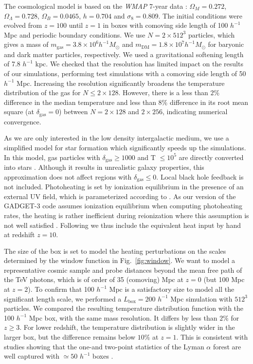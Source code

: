 \documentclass[numberedappendix]{emulateapj}
\begin{document}
The cosmological model is based on the \textit{WMAP} 7-year data \citep{2011ApJS..192...18K}: $\Omega_M=0.272$, $\Omega_{\Lambda}=0.728$, $\Omega_{B}= 0.0465$, $h=0.704$ and $\sigma_8=0.809$. The initial conditions were evolved from $z=100$ until $z=1$ in boxes with comoving side length of 100 $h^{-1}$ Mpc and periodic boundary conditions. We use $N= 2\times 512^3$ particles, which gives a mass of $m_\mathrm{gas}=3.8\times10^{6} h^{-1} M_{\odot}$ and $m_\mathrm{DM}=1.8\times 10^{7} h^{-1} M_{\odot}$ for baryonic and dark matter particles, respectively. We used a gravitational softening length of 7.8 $h^{-1}$ kpc. We checked that the resolution has limited impact on the results of our simulations, performing test simulations with a comoving side length of 50 $h^{-1}$ Mpc. Increasing the resolution significantly broadens the temperature distribution of the gas for $N\leqslant 2\times 128$. However, there is a less than $2\%$ difference in the median temperature and less than $8\%$ difference in its root mean square (at $\delta_{\mathrm{gas}}=0$) between $N=2\times 128$ and $2\times 256$, indicating numerical convergence.

As we are only interested in the low density intergalactic medium, we use a simplified model for star formation which significantly speeds up the simulations. In this model, gas particles with $\delta_{\mathrm{gas}}\geq 1000$ and T $\leq 10^5$ are directly converted into stars \citep{2004MNRAS.354..684V}. Although it results in unrealistic galaxy properties, this approximation does not affect regions with $\delta_{\mathrm{gas}} \leq 0$. Local black hole feedback is not included. Photoheating is set by ionization equilibrium in the presence of an external UV field, which is parameterized according to \citet{2009ApJ...703.1416F}. As our version of the \textsc{GADGET-3} code assumes ionization equilibrium when computing photoheating rates, the heating is rather inefficient during reionization where this assumption is not well satisfied \citep[see e.g.][]{2014arXiv1410.1531P}. Following \citet{2012MNRAS.423..149P} we thus include the equivalent heat input by hand at redshift $z=10$.

The size of the box is set to model the heating perturbations on the scales determined by the window function in Fig.~\ref{fig:window}. We want to model a representative cosmic sample and probe distances beyond the mean free path of the TeV photons, which is of order of 35 (comoving) Mpc at $z=0$ (but 100 Mpc at $z=2$). To confirm that 100 $h^{-1}$ Mpc is a satisfactory size to model all the significant length scale, we performed a $L_\mathrm{box}=200 $ $h^{-1}$ Mpc simulation with $512^3$ particles. We compared the resulting temperature distribution function with the 100 $h^{-1}$ Mpc box, with the same mass resolution. It differs by less than $2\%$ for $z\geqslant 3$. For lower redshift, the temperature distribution is slightly wider in the larger box, but the difference remains below $10\%$ at $z=1$. This is consistent with studies showing that the one-and two-point statistics of the Lyman $\alpha$ forest are well captured with $\simeq 50$ $h^{-1}$ boxes \citep{2007MNRAS.374..196R,2009MNRAS.398L..26B}.
\end{document}
